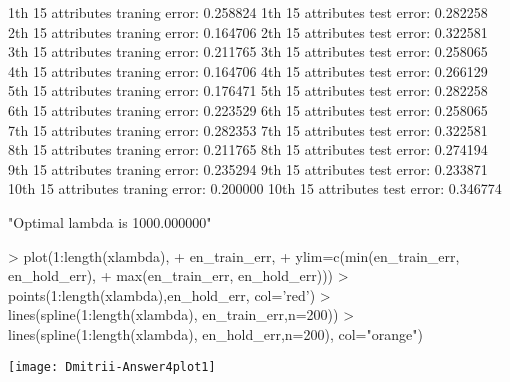 \documentclass{article}
\begin{document}
\begin{Schunk}
\begin{Sinput}
\end{Sinput}
\begin{Soutput}
1th 15 attributes traning error: 0.258824 
1th 15 attributes test error: 0.282258 
2th 15 attributes traning error: 0.164706 
2th 15 attributes test error: 0.322581 
3th 15 attributes traning error: 0.211765 
3th 15 attributes test error: 0.258065 
4th 15 attributes traning error: 0.164706 
4th 15 attributes test error: 0.266129 
5th 15 attributes traning error: 0.176471 
5th 15 attributes test error: 0.282258 
6th 15 attributes traning error: 0.223529 
6th 15 attributes test error: 0.258065 
7th 15 attributes traning error: 0.282353 
7th 15 attributes test error: 0.322581 
8th 15 attributes traning error: 0.211765 
8th 15 attributes test error: 0.274194 
9th 15 attributes traning error: 0.235294 
9th 15 attributes test error: 0.233871 
10th 15 attributes traning error: 0.200000 
10th 15 attributes test error: 0.346774 
\end{Soutput}
\begin{Soutput}
[1] "Optimal lambda is 1000.000000"
\end{Soutput}
\end{Schunk}
\begin{Schunk}
\begin{Sinput}
> plot(1:length(xlambda),
+      en_train_err,
+      ylim=c(min(en_train_err, en_hold_err),
+             max(en_train_err, en_hold_err)))
> points(1:length(xlambda),en_hold_err, col='red')
> lines(spline(1:length(xlambda), en_train_err,n=200))
> lines(spline(1:length(xlambda), en_hold_err,n=200), col="orange")
\end{Sinput}
\end{Schunk}
\texttt{[image: Dmitrii-Answer4plot1]}
\end{document}
